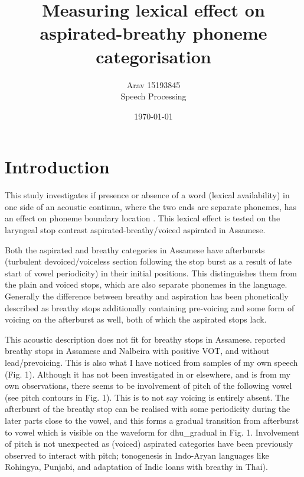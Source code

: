 \documentclass[12pt, english]{article}
\title{\vspace{-50pt}\textbf{Measuring lexical effect on aspirated-breathy phoneme categorisation}\hfill}
\author{Arav 15193845 \\ Speech Processing}
\date{\today}
\begin{document}

\maketitle
\thispagestyle{empty}
\vspace{10pt}



\section*{Introduction}

This study investigates if presence or absence of a word (lexical availability) in one side of an acoustic continua, where the two ends are separate phonemes, has an effect on phoneme boundary location \cite{ganong1980phonetic}. This lexical effect is tested on the laryngeal stop contrast aspirated-breathy/voiced aspirated in Assamese. \\ \par

Both the aspirated and breathy categories in Assamese have afterbursts (turbulent devoiced/voiceless section following the stop burst as a result of late start of vowel periodicity) in their initial positions. This distinguishes them from the plain and voiced stops, which are also separate phonemes in the language. Generally the difference between breathy and aspiration has been phonetically described as breathy stops additionally containing pre-voicing and some form of voicing on the afterburst as well, both of which the aspirated stops lack. \\ \par

This acoustic description does not fit for breathy stops in Assamese. \cite{nath2014preliminary} reported breathy stops in Assamese and Nalbeira with positive VOT, and without lead/prevoicing. This is also what I have noticed from samples of my own speech (Fig. 1). Although it has not been investigated in \cite{nath2014preliminary} or elsewhere, and is from my own observations, there seems to be involvement of pitch of the following vowel (see pitch contours in Fig. 1). This is to not say voicing is entirely absent. The afterburst of the breathy stop can be realised with some periodicity during the later parts close to the vowel, and this forms a gradual transition from afterburst to vowel which is visible on the waveform for dhu\_gradual in Fig. 1. Involvement of pitch is not unexpected as (voiced) aspirated categories have been previously observed to interact with pitch; tonogenesis in Indo-Aryan languages like Rohingya, Punjabi, and adaptation of Indic loans with breathy in Thai). \\ \par
\end{document}

